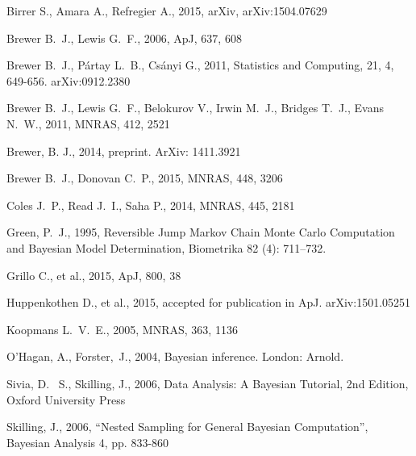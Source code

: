 \documentclass[useAMS,usenatbib]{mn2e}
\begin{document}
\begin{thebibliography}{99}
 Birrer S., Amara A., Refregier A., 2015, arXiv, arXiv:1504.07629

 Brewer B.~J., Lewis G.~F., 2006, ApJ, 637, 608

 Brewer B.~J., P{\'a}rtay L.~B., Cs{\'a}nyi G., 2011,
Statistics and Computing, 21, 4, 649-656. arXiv:0912.2380

Brewer B.~J., Lewis G.~F., Belokurov V., Irwin M.~J., Bridges T.~J., Evans 
N.~W., 2011, MNRAS, 412, 2521

 Brewer, B. J., 2014,
preprint. ArXiv: 1411.3921

 Brewer B.~J., Donovan C.~P., 2015, MNRAS, 448, 3206 

 Coles J.~P., Read J.~I., Saha P., 2014, MNRAS, 445, 2181

Green, P.~J., 1995, Reversible Jump Markov Chain Monte Carlo Computation and Bayesian Model Determination, Biometrika 82 (4): 711–732.

Grillo C., et al., 2015, ApJ, 800, 38 

 Huppenkothen D., et al., 2015,
accepted for publication in ApJ. arXiv:1501.05251 

Koopmans L.~V.~E., 2005, MNRAS, 363, 1136

O'Hagan, A., Forster,~J., 2004, Bayesian inference. London: Arnold.

 Sivia, 
D.~ S., Skilling, J., 2006, Data Analysis: A Bayesian Tutorial, 2nd 
Edition, Oxford University Press

 Skilling, 
J., 2006, ``Nested Sampling for General Bayesian Computation'', Bayesian 
Analysis 4, pp. 833-860


\end{thebibliography}
\end{document}
